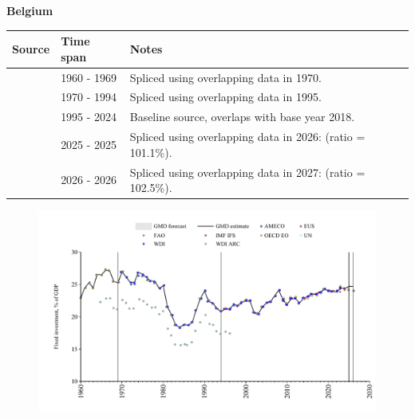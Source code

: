 \documentclass[12pt,a4paper,landscape]{article}
\begin{document}
\begin{adjustbox}{max totalsize={\paperwidth}{\paperheight},center}
\begin{minipage}[t][\textheight][t]{\textwidth}
\vspace*{0.5cm}
{}
\begin{center}
{\Large\bfseries Belgium}
\end{center}
\vspace{0.5cm}
\begin{table}[H]
\centering
\small
\begin{tabular}{|l|l|l|}
\hline
\textbf{Source} & \textbf{Time span} & \textbf{Notes} \\
\hline
\rowcolor{white}\cite{OECD_EO}& 1960 - 1969 &Spliced using overlapping data in 1970.\\
\rowcolor{lightgray}\cite{WDI}& 1970 - 1994 &Spliced using overlapping data in 1995.\\
\rowcolor{white}\cite{EUS}& 1995 - 2024 &Baseline source, overlaps with base year 2018.\\
\rowcolor{lightgray}\cite{OECD_EO}& 2025 - 2025 &Spliced using overlapping data in 2026: (ratio = 101.1\%).\\
\rowcolor{white}\cite{AMECO}& 2026 - 2026 &Spliced using overlapping data in 2027: (ratio = 102.5\%).\\
\hline
\end{tabular}
\end{table}
\begin{figure}[H]
\centering
\includegraphics[width=\textwidth,height=0.6\textheight,keepaspectratio]{graphs/BEL_finv_GDP.pdf}
\end{figure}
\end{minipage}
\end{adjustbox}
\end{document}
